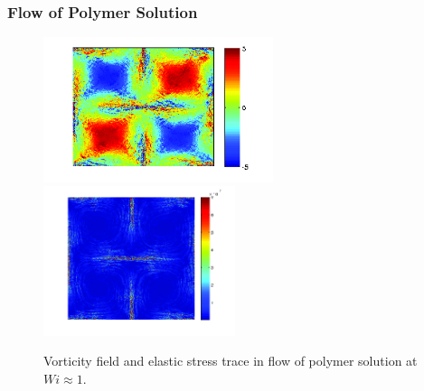 \begin{frame}
  \frametitle{Flow of Polymer Solution}
  \begin{figure}
    \centering
    \includegraphics[width=0.6\textwidth]{img/polymer_loc-10.png}
  \includegraphics[width=0.5\textwidth]{img/polymer_loc-6.png}
    \caption{Vorticity field and elastic stress trace in flow of polymer solution at $Wi\approx1$.}
    \label{fig:vor_pol1}
  \end{figure}
\end{frame}


